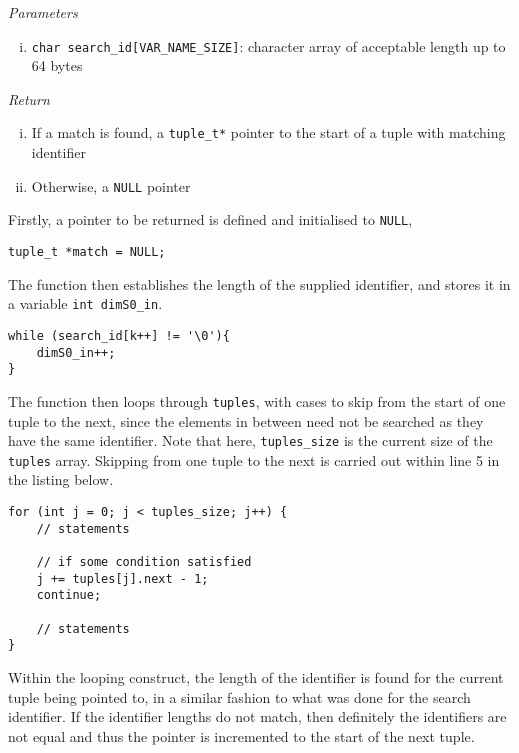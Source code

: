 \documentclass[10pt, a4paper, oneside]{memoir}
\begin{document}
	\textit{Parameters}
	\begin{enumerate}[i.]
		\item \texttt{char search_id[VAR_NAME_SIZE]}: character array of acceptable length up to 64 bytes
	\end{enumerate}

	\textit{Return}
	\begin{enumerate}[i.]
		\item If a match is found, a \texttt{tuple_t*} pointer to the start of a tuple with matching identifier
		\item Otherwise, a \texttt{NULL} pointer
	\end{enumerate}
	
	Firstly, a pointer to be returned is defined and initialised to \texttt{NULL},
\begin{verbatim}
tuple_t *match = NULL;
\end{verbatim}
	
	The function then establishes the length of the supplied identifier, and stores it in a variable \texttt{int dimS0_in}.
\begin{verbatim}
while (search_id[k++] != '\0'){
	dimS0_in++;
}
\end{verbatim}

	The function then loops through \texttt{tuples}, with cases to skip from the start of one tuple to the next, since the elements in between need not be searched as they have the same identifier. Note that here, \texttt{tuples_size} is the current size of the \texttt{tuples} array. Skipping from one tuple to the next is carried out within line 5 in the listing below.
\begin{verbatim}
for (int j = 0; j < tuples_size; j++) {
	// statements

	// if some condition satisfied
	j += tuples[j].next - 1;
	continue; 

	// statements
}
\end{verbatim}

	Within the looping construct, the length of the identifier is found for the current tuple being pointed to, in a similar fashion to what was done for the search identifier. If the identifier lengths do not match, then definitely the identifiers are not equal and thus the pointer is incremented to the start of the next tuple.\\
	
\end{document}
